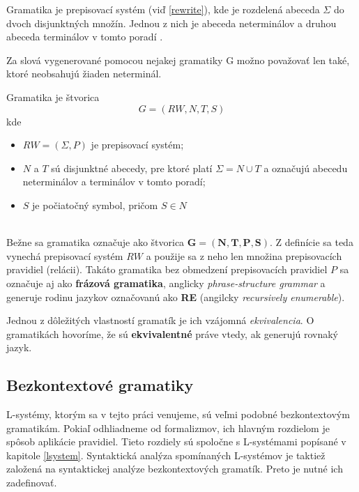 Gramatika je prepisovací systém (viď \ref{rewrite}), kde je rozdelená abeceda $ \Sigma $ do dvoch disjunktných množín. Jednou z nich je abeceda neterminálov a druhou abeceda terminálov v tomto poradí \cite{salomaa}.

Za slová vygenerované pomocou nejakej gramatiky G možno považovať len také, ktoré neobsahujú žiaden neterminál.



\begin{definition}
Gramatika je štvorica
\[G = (RW, N, T, S)\]
kde
\begin{itemize}
    \itemsep0.2em 
    \item[] $ RW = (\Sigma, P) $ je prepisovací systém;
    \item[] $N$ a $T$ sú disjunktné abecedy, pre ktoré platí $\Sigma = N\cup T$ a označujú abecedu neterminálov a terminálov v tomto poradí;
    \item[] $S$ je počiatočný symbol, pričom $S \in N$

\end{itemize}
\end{definition}
\hfill\\

Bežne sa gramatika označuje  ako štvorica $\mathbf{G = (N, T, P, S)}$. Z definície sa teda vynechá prepisovací systém $RW$ a použije sa z neho len množina prepisovacích pravidiel (relácii). Takáto gramatika bez obmedzení prepisovacích pravidiel $P$ sa označuje aj ako \textbf{frázová gramatika}, anglicky \textit{phrase-structure grammar} a generuje rodinu jazykov označovanú ako \textbf{RE} (angilcky \textit{recursively enumerable}).

Jednou z dôležitých vlastností gramatík je ich vzájomná \textit{ekvivalencia}. O gramatikách hovoríme, že sú \textbf{ekvivalentné} práve vtedy, ak generujú rovnaký jazyk.


\subsection*{Bezkontextové gramatiky}

L-systémy, ktorým sa v tejto práci venujeme, sú veľmi podobné bezkontextovým gramatikám. Pokiaľ odhliadneme od formalizmov, ich hlavným rozdielom je spôsob aplikácie pravidiel. Tieto rozdiely sú spoločne s L-systémami popísané v kapitole \ref{lsystem}. Syntaktická analýza spomínaných L-systémov je taktiež založená na syntaktickej analýze bezkontextových gramatík. Preto je nutné ich zadefinovať.

